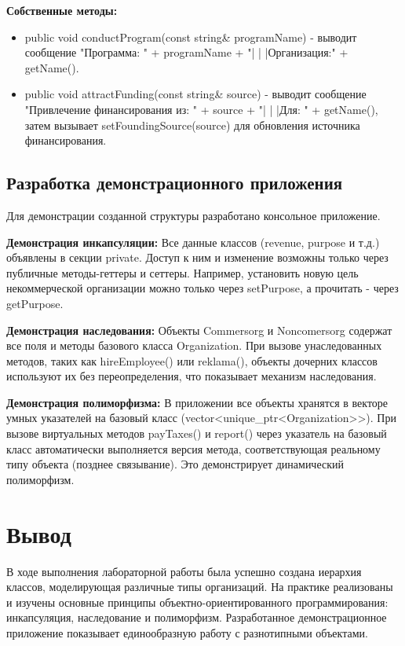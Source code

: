 \documentclass[oneside,a4paper,14pt]{extarticle}
\begin{document}
    \textbf{Собственные методы:}
    \begin{itemize}
        \item public void conductProgram(const string\& programName) - выводит сообщение "Программа: " + programName + "| | |Организация:" + getName().
        \item public void attractFunding(const string\& source) - выводит сообщение "Привлечение финансирования из: " + source + "| | |Для: " + getName(), затем вызывает setFoundingSource(source) для обновления источника финансирования.
    \end{itemize}

    \newpage

    \subsection*{Разработка демонстрационного приложения}

    Для демонстрации созданной структуры разработано консольное приложение.

    \textbf{Демонстрация инкапсуляции:}
    Все данные классов (revenue, purpose и т.д.) объявлены в секции private. Доступ к ним и изменение возможны только через публичные методы-геттеры и сеттеры. Например, установить новую цель некоммерческой организации можно только через setPurpose, а прочитать - через getPurpose.

    \textbf{Демонстрация наследования:}
    Объекты Commersorg и Noncomersorg содержат все поля и методы базового класса Organization. При вызове унаследованных методов, таких как hireEmployee() или reklama(), объекты дочерних классов используют их без переопределения, что показывает механизм наследования.

    \textbf{Демонстрация полиморфизма:}
    В приложении все объекты хранятся в векторе умных указателей на базовый класс (vector<unique\_ptr<Organization>>). При вызове виртуальных методов payTaxes() и report() через указатель на базовый класс автоматически выполняется версия метода, соответствующая реальному типу объекта (позднее связывание). Это демонстрирует динамический полиморфизм.

    \newpage

    \section*{Вывод}

    В ходе выполнения лабораторной работы была успешно создана иерархия классов, моделирующая различные типы организаций. На практике реализованы и изучены основные принципы объектно-ориентированного программирования: инкапсуляция, наследование и полиморфизм. Разработанное демонстрационное приложение показывает единообразную работу с разнотипными объектами.

    
\end{document}
